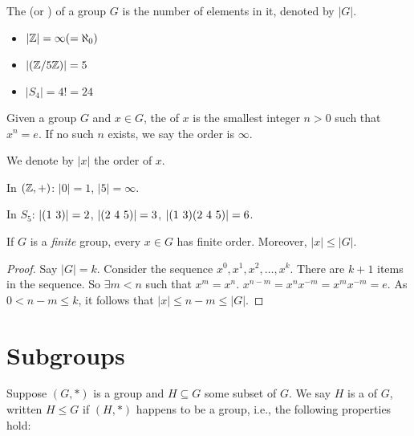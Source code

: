 \documentclass[notes.tex]{subfiles}
\begin{document}

\begin{definition}
	The  (or ) of a group $G$ is the number of elements in it, denoted by $|G|$.
\end{definition}

\begin{eg}\leavevmode
	\begin{itemize}
		\item  $|\mathbb{Z}| = \infty (= \aleph_0)$
		\item $|(\mathbb{Z}/5\mathbb{Z})| = 5$
		\item $|S_4| = 4! = 24$
	\end{itemize}
\end{eg}


\begin{definition}
	Given a group $G$ and $x\in G$, the  of $x$ is the smallest integer $n>0$ such that $x^n=e$. If no such $n$ exists, we say the order is $\infty$.

	We denote by $|x|$ the order of $x$.
\end{definition}

\begin{eg}
	In $(\mathbb{Z}, +)$:
	$|0| = 1$, $|5| = \infty$.

	In $S_5$:
	$|\text{(1 3)}| = 2$, $|\text{(2 4 5)}| = 3$, $|\text{(1 3)}\text{(2 4 5)}| = 6$.
\end{eg}

\begin{proposition}
	If $G$ is a \emph{finite}  group, every $x\in G$ has finite order.
	Moreover, $|x| \le |G|$.
\end{proposition}
\begin{proof}
	Say $|G| = k$. Consider the sequence $x^0, x^1, x^2, \ldots, x^k$.
	There are $k+1$ items in the sequence. So $\exists m < n$ such that $x^m=x^n$.
		$x^{n-m} = x^nx^{-m} = x^mx^{-m} = e$.
		As $0 < n-m \le k$, it follows that $|x|\le n-m \le |G|$.
\end{proof}

\chapter{Subgroups} %
\label{ssub:subgroups}
\begin{definition}
	Suppose $(G, *)$ is a group and $H\subseteq G$ some subset of $G$. 
	We say $H$ is a  of $G$, written $H\le G$ if $(H, *)$ happens to be a group, i.e., the following properties hold:
\end{definition}
\end{document}
